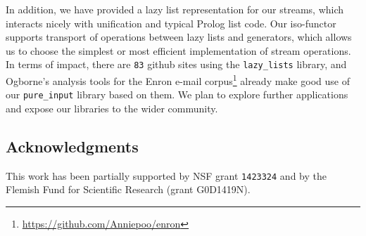 \documentclass[submission,copyright,creativecommons]{eptcs}
\begin{document}
In addition, we have provided a lazy list representation for our streams, which
interacts nicely with unification and typical Prolog list code. Our iso-functor
supports  transport of operations between lazy lists and generators, which
allows us to choose the simplest or most efficient implementation of stream
operations. In terms of impact, there are {\tt 83} github sites using the {\tt lazy\_lists} library, and
 Ogborne's analysis tools for the Enron e-mail
corpus\footnote{\url{https://github.com/Anniepoo/enron}} already make good use
of our {\tt pure\_input} library based on them. We plan to explore further applications and
expose our libraries to the wider community.


\subsection*{Acknowledgments}
This work has been partially supported by NSF grant \verb~1423324~
and by the Flemish Fund for Scientific Research (grant G0D1419N).



%

\newpage
\appendix

\end{document}
